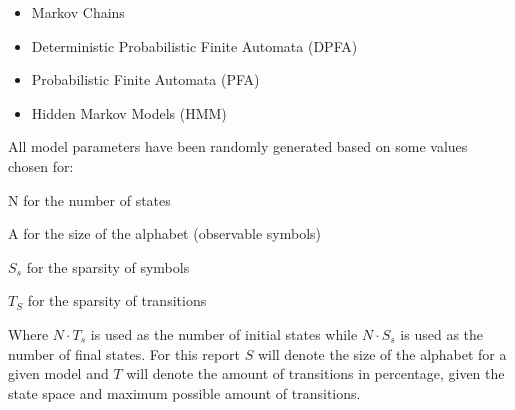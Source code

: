 \begin{itemize}
\item Markov Chains
\item Deterministic Probabilistic Finite Automata (DPFA)
\item Probabilistic Finite Automata (PFA)
\item Hidden Markov Models (HMM)
\end{itemize}
All model parameters have been randomly generated based on some values chosen for:
\begin{description}
\item N for the number of states
\item A for the size of the alphabet (observable symbols)
\item $S_s$ for the sparsity of symbols
\item $T_S$ for the sparsity of transitions
\end{description}
Where $N \cdot T_s$ is used as the number of initial states while $N \cdot S_s$ is used as the number of final states. For this report $S$ will denote the size of the alphabet for a given model and $T$ will denote the amount of transitions in percentage, given the state space and maximum possible amount of transitions.
